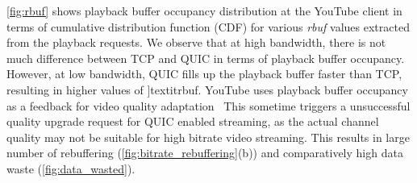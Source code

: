 \fig\ref{fig:rbuf} shows playback buffer occupancy distribution at the YouTube client in terms of cumulative distribution function (CDF) for various \textit{rbuf} values extracted from the playback requests. We observe that at high bandwidth, there is not much difference between TCP and QUIC in terms of playback buffer occupancy. However, at low bandwidth, QUIC fills up the playback buffer faster than TCP, resulting in higher values of ]textit{rbuf}. 
YouTube uses playback buffer occupancy as a feedback for video quality adaptation~\cite{mondal2017youtube,krishnappa2013dashing}
This sometime triggers a unsuccessful quality upgrade request for QUIC enabled streaming, as the actual channel quality may not be suitable for high bitrate video streaming. This results in large number of rebuffering (\fig\ref{fig:bitrate_rebuffering}(b)) and comparatively high data waste (\fig\ref{fig:data_wasted}).



